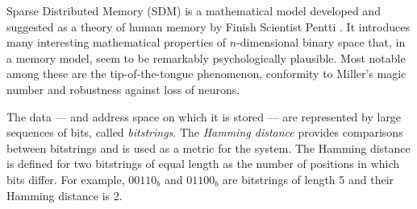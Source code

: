 
Sparse Distributed Memory (SDM) is a mathematical model developed and suggested as a theory of human memory by Finish Scientist Pentti \citet{Kanerva1988}. It introduces many interesting mathematical properties of $n$-dimensional binary space that, in a memory model, seem to be remarkably psychologically plausible.  Most notable among these are the tip-of-the-tongue phenomenon, conformity to Miller's magic number \citep{Linhares2011} and robustness against loss of neurons.

The data --- and address space on which it is stored --- are represented by large sequences of bits, called \emph{bitstrings}. The \emph{Hamming distance} provides comparisons between bitstrings and is used as a metric for the system. The Hamming distance is defined for two bitstrings of equal length as the number of positions in which bits differ. For example, $00110_{b}$ and $01100_{b}$ are bitstrings of length 5 and their Hamming distance is 2.

